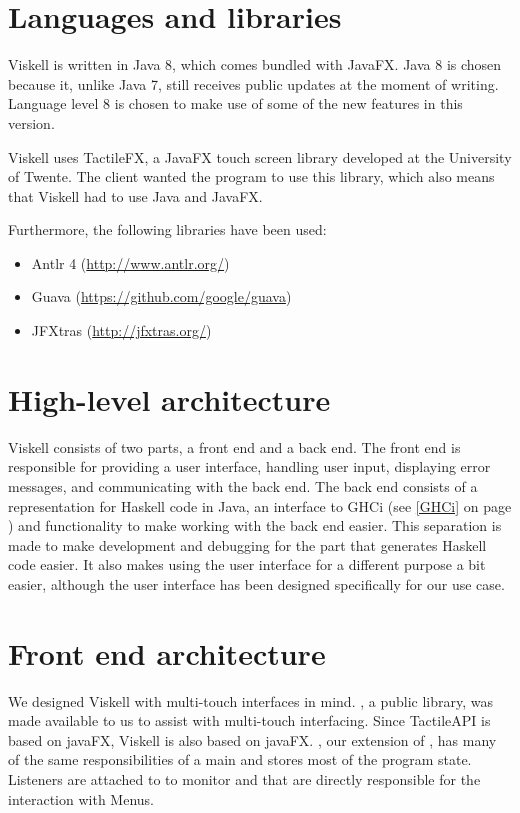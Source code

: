 \section{Languages and libraries}
Viskell is written in Java 8, which comes bundled with JavaFX. 
Java 8 is chosen because it, unlike Java 7, still receives public updates at the moment of writing.
Language level 8 is chosen to make use of some of the new features in this version.

Viskell uses TactileFX, a JavaFX touch screen library developed at the University of Twente.
The client wanted the program to use this library, which also means that Viskell had to use Java and JavaFX.

Furthermore, the following libraries have been used:

\begin{itemize}
	\item Antlr 4 (\url{http://www.antlr.org/})
	\item Guava (\url{https://github.com/google/guava})
	\item JFXtras (\url{http://jfxtras.org/})
\end{itemize}

\section{High-level architecture}
Viskell consists of two parts, a front end and a back end.  
The front end is responsible for providing a user interface, handling user input, displaying error messages, and communicating with the back end.
The back end consists of a representation for Haskell code in Java, an interface to GHCi (see \ref{GHCi} on page \pageref{GHCi}) and functionality to make working with the back end easier.
This separation is made to make development and debugging for the part that generates Haskell code easier.
It also makes using the user interface for a different purpose a bit easier, although the user interface has been designed specifically for our use case.

\section{Front end architecture}
We designed Viskell with multi-touch interfaces in mind. , a public library, was made available to us to assist with multi-touch interfacing. Since TactileAPI is based on javaFX, Viskell is also based on javaFX. , our extension of , has many of the same responsibilities of a main  and stores most of the program state.
Listeners are attached to  to monitor  and  that are directly responsible for the interaction with Menus.

